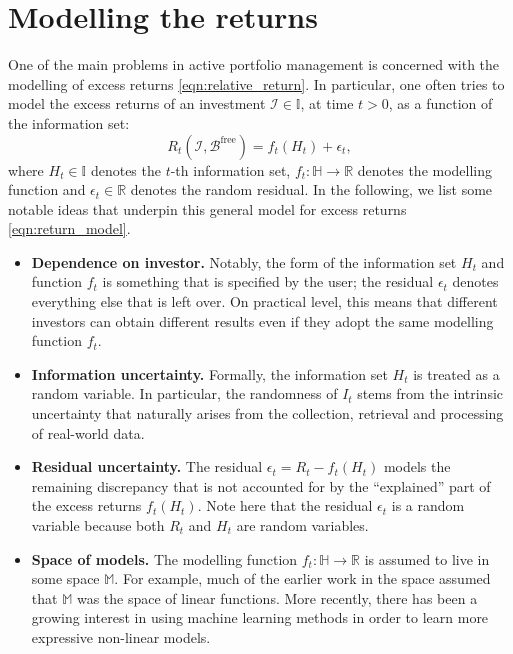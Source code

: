 \documentclass[12pt]{article}
\begin{document}
\section{Modelling the returns}
One of the main problems in active portfolio management is concerned with the modelling of excess returns \eqref{eqn:relative_return}. In particular, one often tries to model the excess returns of an investment $\mathcal{I} \in \mathbb{I}$, at time $t > 0$, as a function of the information set:
\begin{equation}
    R_t(\mathcal{I}, \mathcal{B}^{\text{free}}) = f_t(H_t) + \epsilon_t,
    \label{eqn:return_model}
\end{equation}
where $H_t \in \mathbb{I}$ denotes the $t$-th information set, $f_t: \mathbb{H} \rightarrow \mathbb{R}$ denotes the modelling function and $\epsilon_t \in \mathbb{R}$ denotes the random residual. In the following, we list some notable ideas that underpin this general model for excess returns \eqref{eqn:return_model}.

\begin{itemize}
    \item \textbf{Dependence on investor.} Notably, the form of the information set $H_t$ and function $f_t$ is something that is specified by the user; the residual $\epsilon_t$ denotes everything else that is left over. On practical level, this means that different investors can obtain different results even if they adopt the same modelling function $f_t$. 
    \item \textbf{Information uncertainty.} Formally, the information set $H_t$ is treated as a random variable. In particular, the randomness of $I_t$ stems from the intrinsic uncertainty that naturally arises from the collection, retrieval and processing of real-world data. 
    \item \textbf{Residual uncertainty.} The residual $\epsilon_t = R_t - f_t(H_t)$ models the remaining discrepancy that is not accounted for by the ``explained'' part of the excess returns $f_t(H_t)$. Note here that the residual $\epsilon_t$ is a random variable because both $R_t$ and $H_t$ are random variables.
    \item \textbf{Space of models.} The modelling function $f_t: \mathbb{H} \rightarrow \mathbb{R}$ is assumed to live in some space $\mathbb{M}$. For example, much of the earlier work in the space assumed that $\mathbb{M}$ was the space of linear functions. More recently, there has been a growing interest in using machine learning methods in order to learn more expressive non-linear models.
\end{itemize}
\end{document}
